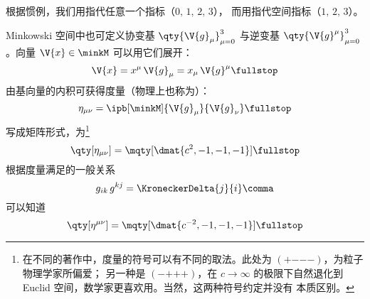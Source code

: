 根据惯例，我们用指代任意一个指标（$0,\,1,\,2,\,3$），
而用指代空间指标（$1,\,2,\,3$）。

Minkowski 空间中也可定义协变基 $\qty{\V{g}_\mu}_{\mu=0}^3$ 与逆变基
$\qty{\V{g}^\mu_{\vphantom{\mu}}}_{\mu=0}^3$。向量 $\V{x}\in\minkM$
可以用它们展开：
\begin{equation}
  \V{x} = x^\mu\,\V{g}_\mu = x_\mu\,\V{g}^\mu \fullstop
\end{equation}
由基向量的内积可获得度量（物理上也称为）：
\begin{equation}
  \eta_{\mu\nu} = \ipb[\minkM]{\V{g}_\mu}{\V{g}_\nu} \fullstop
\end{equation}
写成矩阵形式，为\footnote{
  在不同的著作中，度量的符号可以有不同的取法。此处为
  $(\mathord{+}\mathord{-}\mathord{-}\mathord{-})$，为粒子物理学家所偏爱；
  另一种是 $(\mathord{-}\mathord{+}\mathord{+}\mathord{+})$，在 $c\to\infty$
  的极限下自然退化到 Euclid 空间，数学家更喜欢用。当然，这两种符号约定并没有
  本质区别。}
\begin{equation}
  \qty[\eta_{\mu\nu}] = \mqty[\dmat{c^2, -1, -1, -1}] \fullstop
\end{equation}
根据度量满足的一般关系
\begin{equation}
  g_{ik}\,g^{kj} = \KroneckerDelta{j}{i} \comma
\end{equation}
可以知道
\begin{equation}
  \qty[\eta^{\mu\nu}] = \mqty[\dmat{c^{-2}, -1, -1, -1}] \fullstop
\end{equation}





